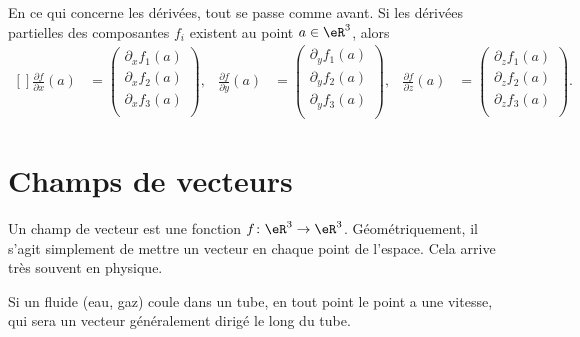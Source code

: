 En ce qui concerne les dérivées, tout se passe comme avant. Si les dérivées partielles des composantes $f_i$ existent au point $a\in\eR^3$, alors
\begin{equation}
    \begin{aligned}[]
        \frac{ \partial f }{ \partial x }(a)&=\begin{pmatrix}
            \partial_xf_1(a)    \\ 
            \partial_xf_2(a)    \\ 
            \partial_xf_3(a)    \\ 
        \end{pmatrix},&
        \frac{ \partial f }{ \partial y }(a)&=\begin{pmatrix}
            \partial_yf_1(a)    \\ 
            \partial_yf_2(a)    \\ 
            \partial_yf_3(a)    \\ 
        \end{pmatrix},&
        \frac{ \partial f }{ \partial z }(a)&=\begin{pmatrix}
            \partial_zf_1(a)    \\ 
            \partial_zf_2(a)    \\ 
            \partial_zf_3(a)    \\ 
        \end{pmatrix}.
    \end{aligned}
\end{equation}

\section{Champs de vecteurs}

Un champ de vecteur est une fonction $f\colon \eR^3\to \eR^3$. Géométriquement, il s'agit simplement de mettre un vecteur en chaque point de l'espace. Cela arrive très souvent en physique.

\begin{example}
    Si un fluide (eau, gaz) coule dans un tube, en tout point le point a une vitesse, qui sera un vecteur généralement dirigé le long du tube.
\end{example}

